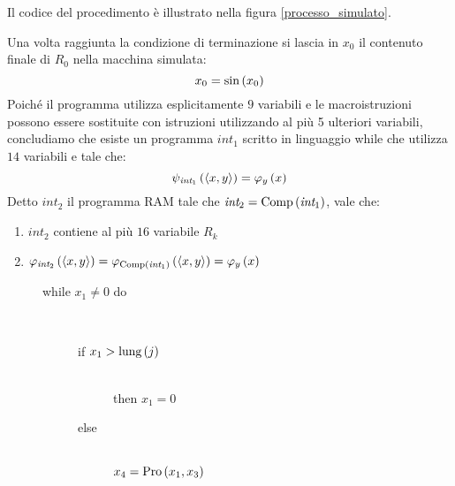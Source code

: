 \documentclass{lectures}
\begin{document}
\begin{definition}[Interprete]
\begin{multicols}{2}
        Il codice del procedimento è illustrato nella figura \ref{processo_simulato}.
        
        Una volta raggiunta la condizione di terminazione si lascia in \(x_0\) il contenuto finale di \(R_0\) nella macchina simulata:
        \[
            x_0 = \text{sin}\left(x_0\right)
        \]
        Poiché il programma utilizza esplicitamente \(9\) variabili e le macroistruzioni possono essere sostituite con istruzioni utilizzando al più 5 ulteriori variabili, concludiamo che esiste un programma \(\textit{int}_1\) scritto in linguaggio while che utilizza \(14\) variabili e tale che:
        \[
            \psi_{\textit{int}_1}\left(\left\langle x,y\right\rangle\right) = \varphi_y\left(x\right)
        \]
        Detto \(\textit{int}_2\) il programma RAM tale che \(\textit{int}_2 = \text{Comp}\left(\textit{int}_1\right)\), vale che:
        \begin{enumerate}
            \item \(\textit{int}_2\) contiene al più \(16\) variabile \(R_k\)
            \item \(\varphi_{\textit{int}_2}\left(\left\langle x,y\right\rangle\right) = \varphi_{\text{Comp}\left(\textit{int}_1\right)}\left(\left\langle x,y\right\rangle\right) = \varphi_y\left(x\right)\)
        \end{enumerate}
        \vfill\null
        \columnbreak
        \begin{figure}
            \begin{description}
                \item[while \(x_1 \neq 0\) do] ~\\
                \begin{description}
                    \item[if \(x_1>\text{lung}\left(j\right)\)] ~\\
                        then \(x_1 = 0\)
                    \item[else] ~\\\(x_4=\text{Pro}\left(x_1, x_3\right)\)
\end{description}
\end{description}
\end{figure}
\end{multicols}
\end{definition}
\end{document}
